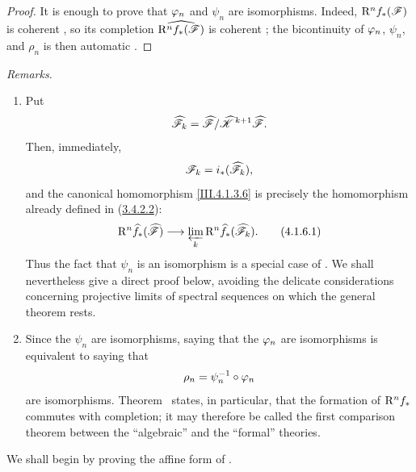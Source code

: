 \begin{proof}
It is enough to prove that $\varphi_n$ and $\psi_n$ are isomorphisms.
Indeed, $\mathrm{R}^n f_*(\mathscr{F})$ is coherent , so its
completion $\widehat{\mathrm{R}^n f_*(\mathscr{F})}$ is coherent
; the bicontinuity of $\varphi_n$, $\psi_n$, and
$\rho_n$ is then automatic .
\end{proof}

\begin{env}[4.1.6]
\label{III.4.1.6}
\emph{Remarks.}
\begin{enumerate}
  \item[(i)] Put
  \[
    \widehat{\mathscr{F}}_k
    =
    \widehat{\mathscr{F}}/
    \widehat{\mathscr{K}}^{\,k+1}\widehat{\mathscr{F}}.
  \]
  Then, immediately,
  \[
    \mathscr{F}_k=i_*(\widehat{\mathscr{F}}_k),
  \]
  and the canonical homomorphism \eqref{III.4.1.3.6} is precisely the
  homomorphism already defined in (\hyperref[III.3.4.2.2]{3.4.2.2}):
  \[
    \mathrm{R}^n\widehat{f}_*(\widehat{\mathscr{F}})
    \longrightarrow
    \varprojlim_k
    \mathrm{R}^n\widehat{f}_*(\widehat{\mathscr{F}}_k).
    \tag{4.1.6.1}
    \label{III.4.1.6.1}
  \]
  Thus the fact that $\psi_n$ is an isomorphism is a special case of
  .
  We shall nevertheless give a direct proof below, avoiding the
  delicate considerations concerning projective limits of spectral
  sequences  on which the general theorem
   rests.

  \item[(ii)] Since the $\psi_n$ are isomorphisms, saying that the
  $\varphi_n$ are isomorphisms is equivalent to saying that
  \[
    \rho_n=\psi_n^{-1}\circ\varphi_n
  \]
  are isomorphisms.
  Theorem~ states, in particular, that the formation of
  $\mathrm{R}^n f_*$ commutes with completion; it may therefore be called the
  first comparison theorem between the ``algebraic'' and the
  ``formal'' theories.
\end{enumerate}
We shall begin by proving the affine form of .
\end{env}

